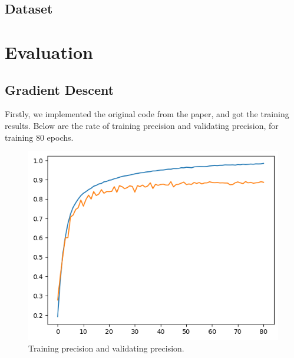 \section{Dataset}

\chapter{Evaluation}
\section{Gradient Descent}
Firstly, we implemented the original code from the paper, and got the training results. Below are the rate of training precision and validating precision, for training 80 epochs.

\begin{figure}[h]
    \centering %
        \includegraphics[width=0.8\linewidth]{./output.png} 
    \caption{Training precision and validating precision.}
    \label{figure:sample figure} %
\end{figure}




